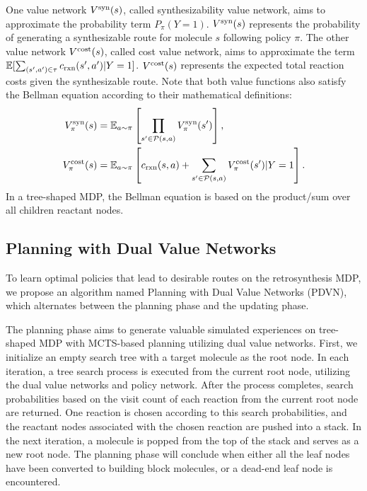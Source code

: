 \documentclass[nohyperref]{article}
\theoremstyle{plain}
\theoremstyle{definition}
\theoremstyle{remark}
\begin{document}
One value network $V^{\rm syn}(s)$, called synthesizability value network, aims to approximate the probability term $P_{\pi}(Y=1)$. 
$V^{\rm syn}(s)$ represents the probability of generating a synthesizable route for molecule $s$
following policy $\pi$. 
The other value network $V^{\rm cost}(s)$, called cost value network, aims to approximate the term $\mathbb{E}[\sum_{(s', a')\in\tau} c_{\rm rxn}(s', a')|Y=1]$. 
$V^{\rm cost}(s)$ represents the expected total reaction costs given the synthesizable route.
Note that both value functions also satisfy the Bellman equation according to their mathematical definitions:
\begin{equation}
\begin{aligned}
V^{\rm syn}_{\pi}(s) & = \mathbb{E}_{a\sim\pi}\left[\prod_{s'\in\mathcal{P}(s, a)} V^{\rm syn}_\pi(s')\right], \\
V^{\rm cost}_{\pi}(s) & = \mathbb{E}_{a\sim\pi}\left[c_{\rm rxn}(s, a) + \sum_{s'\in\mathcal{P}(s, a)} V^{\rm cost}_{\pi}(s') |Y=1 \right].
\label{eqn:bellman}
\end{aligned}
\end{equation}
In a tree-shaped MDP, the Bellman equation is based on the product/sum over all children reactant nodes.



\subsection{Planning with Dual Value Networks}\label{sec:planning}


To learn optimal policies that lead to desirable routes on the retrosynthesis MDP, we propose an algorithm named Planning with Dual Value Networks (PDVN), which alternates between the planning phase and the updating phase. 

The planning phase aims to generate valuable simulated experiences on tree-shaped MDP with MCTS-based planning utilizing dual value networks. 
First, we initialize an empty search tree with a target molecule as the root node.
In each iteration, a tree search process is executed from the current root node, utilizing the dual value networks and policy network. 
After the process completes, search probabilities based on the visit count of each reaction from the current root node are returned.
One reaction is chosen according 
to this search probabilities,
and the reactant nodes associated with the chosen reaction are pushed into a stack. 
In the next iteration, a molecule is popped from the top of the stack and serves as a new root node. 
The planning phase will conclude when either all the leaf nodes have been converted to building block molecules, or a dead-end leaf node is encountered.
\end{document}
